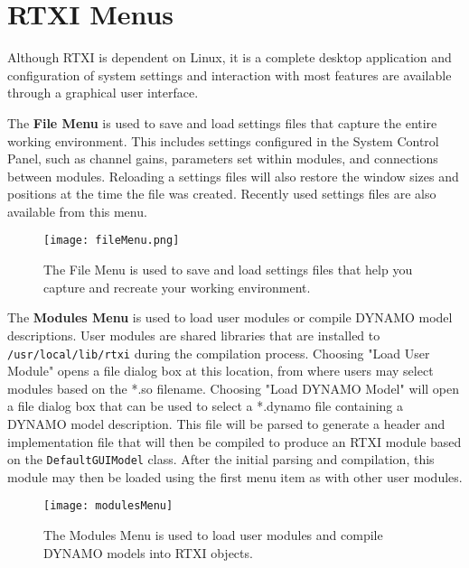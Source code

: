 \section{RTXI Menus}

Although RTXI is dependent on Linux, it is a complete desktop application and configuration of system settings and interaction with most features are available through a graphical user interface.

The \textbf{File Menu} is used to save and load settings files that capture the entire working environment. This includes settings configured in the System Control Panel, such as channel gains, parameters set within modules, and connections between modules. Reloading a settings files will also restore the window sizes and positions at the time the file was created. Recently used settings files are also available from this menu.

\begin{figure}[h]
\begin{center}
\texttt{[image: fileMenu.png]} 
\caption[File Menu]{The File Menu is used to save and load settings files that help you capture and recreate your working environment.} 
\end{center}
\end{figure}

The \textbf{Modules Menu} is used to load user modules or compile DYNAMO model descriptions. User modules are shared libraries that are installed to \texttt{/usr/local/lib/rtxi} during the compilation process. Choosing "Load User Module" opens a file dialog box at this location, from where users may select modules based on the *.so filename. Choosing "Load DYNAMO Model" will open a file dialog box that can be used to select a *.dynamo file containing a DYNAMO model description. This file will be parsed to generate a \cpp header and implementation file that will then be compiled to produce an RTXI module based on the \texttt{DefaultGUIModel} class. After the initial parsing and compilation, this module may then be loaded using the first menu item as with other user modules.

\begin{figure}[h]
\begin{center}
\texttt{[image: modulesMenu]} 
\caption[Modules Menu]{The Modules Menu is used to load user modules and compile DYNAMO models into RTXI objects.} 
\end{center}
\end{figure}

